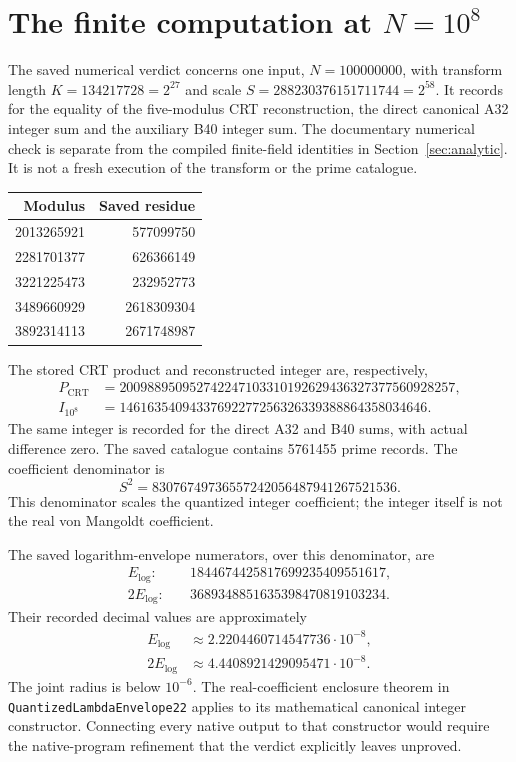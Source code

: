 \section{The finite computation at $N=10^8$}
\label{sec:numerical}

The saved numerical verdict concerns one input,
$N=100000000$, with transform length $K=134217728=2^{27}$ and
scale $S=288230376151711744=2^{58}$. It records
 for the equality of the
five-modulus CRT reconstruction, the direct canonical A32 integer sum and
the auxiliary B40 integer sum. The documentary numerical check is separate
from the compiled finite-field identities in Section~\ref{sec:analytic}.
It is not a fresh execution of the transform or the prime catalogue.

\begin{center}
\begin{tabular}{rr}
\toprule Modulus & Saved residue\\\midrule
2013265921 & 577099750\\
2281701377 & 626366149\\
3221225473 & 232952773\\
3489660929 & 2618309304\\
3892314113 & 2671748987\\
\bottomrule
\end{tabular}
\end{center}

The stored CRT product and reconstructed integer are, respectively,
\begin{align*}
 P_{\mathrm{CRT}}&=200988950952742247103310192629436327377560928257,\\
 I_{10^8}&=14616354094337692277256326339388864358034646.
\end{align*}
The same integer is recorded for the direct A32 and B40 sums, with
actual difference zero. The saved catalogue contains 5761455 prime
records. The coefficient denominator is
\[
 S^2=83076749736557242056487941267521536.
\]
This denominator scales the quantized integer coefficient; the integer
itself is not the real von Mangoldt coefficient.

The saved logarithm-envelope numerators, over this denominator, are
\begin{align*}
 E_{\log}:&\quad1844674425817699235409551617,\\
 2E_{\log}:&\quad3689348851635398470819103234.
\end{align*}
Their recorded decimal values are approximately
\begin{align*}
 E_{\log}&\approx2.2204460714547736\cdot10^{-8},\\
 2E_{\log}&\approx4.4408921429095471\cdot10^{-8}.
\end{align*}
The joint radius is below $10^{-6}$. The real-coefficient enclosure theorem in
\nolinkurl{QuantizedLambdaEnvelope22} applies to its mathematical
canonical integer constructor. Connecting every native output to that
constructor would require the native-program refinement that the verdict
explicitly leaves unproved.

